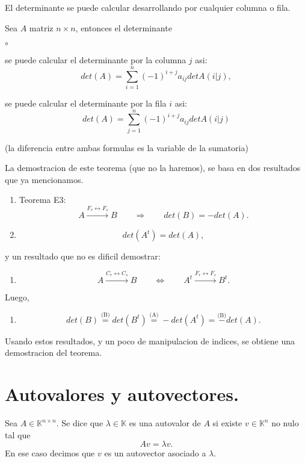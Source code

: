 \documentclass{article}
\theoremstyle{definition}
\theoremstyle{definition}
\theoremstyle{remark}
\begin{document}
El determinante se puede calcular desarrollando por cualquier columna o fila. 
\begin{teo}
  Sea $A$ matriz $n \times n$, entonces el determinante 
  \begin{list}{$\circ$}{}  
  \item  se puede calcular el determinante por la columna $j$ asi: \[
      det(A)=\sum_{i=1}^{n}(-1)^{i+j}a_{ij}detA(i|j),
    \]
  \item se puede calcular el determinante por la fila $i$ asi: \[
      det(A)=\sum_{j=1}^{n}(-1)^{i+j}a_{ij}detA(i|j)
    \]
\end{list}
    (la diferencia entre ambas formulas es la variable de la sumatoria)
\end{teo}
La demostracion de este teorema (que no la haremos), se basa en dos resultados que ya mencionamos. \begin{enumerate}[label=(\Alph*)]
  \item Teorema E3: \[
      A \xrightarrow{F_r \leftrightarrow F_s} B \quad \quad \Rightarrow \quad \quad det(B)=-det(A).
    \]
\item $$det(A^t)=det(A),$$
  \end{enumerate}
  y un resultado que no es dificil demostrar: \begin{enumerate}[label=(\Alph*), start=3]
    \item \[
        A \xrightarrow{C_r \leftrightarrow C_s} B \quad \quad \Leftrightarrow \quad \quad A^t \xrightarrow{F_r \leftrightarrow F_s } B ^t . 
      \]
    \end{enumerate}
    Luego, \begin{enumerate}[label=(\Alph*), start=4]
      \item \[
          det(B) \overset{\text{(B)}}{=}det(B^t) \overset{\text{(A)}}=-det(A^t)=\overset{\text{(B)}}-det(A).
        \]
    \end{enumerate}
    Usando estos resultados, y un poco de manipulacion de indices, se obtiene una demostracion del teorema.
    \pagebreak

    \section{Autovalores y autovectores.}
\begin{defi}
  Sea $A \in \mathbb{K}^{n \times n}$. Se dice que $\lambda \in \mathbb{K}$ es una autovalor de $A$ si existe $v \in \mathbb{K}^{n}$ no nulo tal que \[
Av=\lambda v.
  \]
  En ese caso decimos que $v$ es un autovector asociado a $\lambda$.
\end{defi}
\end{document}
